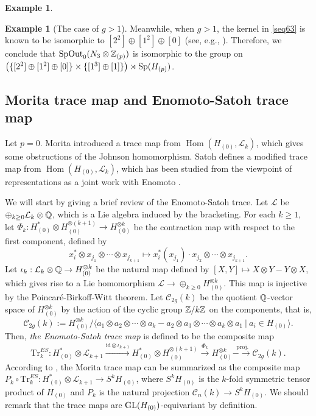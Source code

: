 \documentclass{article}
\theoremstyle{plain}
\theoremstyle{definition}
\newtheorem{exa}[thm]{Example}
\def\Hom{\mathop{\mathrm{Hom}}\nolimits}
\newcommand{\lra}{\longrightarrow}
\newcommand{\ra}{\rightarrow}
\newcommand{\Q}{{\Bbb Q}}
\newcommand{\Z}{{\Bbb Z}}
\newcommand{\Sp}{{\rm Sp}}
\newcommand{\GL}{{\rm GL}}
\newcommand{\SpOut}{{\rm SpOut}}
\newcommand{\id}{{\mathrm{id}}}
\begin{document}
{\begin{exa}
\end{exa}
\begin{exa}
[{The case of $g>1$}]\label{ex14k2} Meanwhile, when $g>1$, the kernel in \eqref{seq63} is known to be isomorphic to $[2^2]\oplus[1^2] \oplus [0] $ (see, e.g., \cite[page 33]{Sa}).
Therefore, we conclude that $\SpOut_0( N_3 \otimes \Z_{(p)}) $ is isomorphic to the group on $\bigl(\{ [2^2 ] \oplus [1^2] \oplus [0]\} \times \{ [1^3] \oplus [1] \} \bigr) \rtimes \Sp(H_{(p)})$.
\end{exa}

\subsection{Morita trace map and Enomoto-Satoh trace map}
\label{93123}
Let $p=0$. Morita \cite{Mo3} introduced a trace map from $ \Hom( H_{(0)}, \mathcal{L}_k )$, which gives some obstructions of the Johnson homomorphism. Satoh \cite{Sa1} defines a modified trace map from $ \Hom( H_{(0)}, \mathcal{L}_k )$, which has been studied from the viewpoint of representations as a joint work with Enomoto \cite{ES}. %

We will start by giving a brief review of the Enomoto-Satoh trace. Let $ \mathcal{L} $ be $\oplus_{k \geq 0 }\mathcal{L}_k \otimes \Q $, which is a Lie algebra induced by the bracketing. For each $k \geq 1$, let $\Phi_k: H^*_{(0)} \otimes H^{\otimes (k+1)}_{(0)} \ra H^{\otimes k}_{(0)}$ be the contraction map with respect to the first component, defined by
\[ x_i^* \otimes x_{j_1} \otimes \cdots \otimes x_{j_{k+1}} \longmapsto
x_i^*(x_{j_1}) \cdot x_{j_2} \otimes \cdots \otimes x_{j_{k+1}} . \]
Let $\iota_k : \mathcal{L}_k \otimes \Q \ra H^{\otimes k}_{(0)} $ be the natural map defined by $[X,Y] \mapsto X\otimes Y -Y \otimes X$, which gives rise to a Lie homomorphism $ \mathcal{L} \ra \oplus_{k \geq 0 }H^{\otimes k}_{(0)} $. This map is injective by the Poincar\'{e}-Birkoff-Witt theorem. Let $\mathcal{C}_{2g}(k)$ be the quotient $\Q$-vector space of $ H^{\otimes k}_{(0)}$ by the action of the cyclic group $\Z/k\Z$ on the components, that is,
\[\mathcal{C}_{2g} (k):= H^{\otimes k}_{(0)}/ \langle
a_1 \otimes a_2 \otimes \cdots \otimes a_k - a_2 \otimes a_3 \otimes \cdots \otimes a_k \otimes a_1 \ | \ a_i \in H_{(0)} \rangle . \]
Then, {\it the Enomoto-Satoh trace map} is defined to be the composite map
\[ \mathrm{Tr}_{k}^{ES} : H^*_{(0)} \otimes \mathcal{L}_{k+1} \xrightarrow{\id \otimes \iota_{k+1} } H^*_{(0)} \otimes H^{\otimes (k+1)}_{(0)} \stackrel{\Phi_k }{\lra} H^{\otimes k}_{(0)}
\stackrel{\mathrm{proj.}}{- \!\!\!\! \lra} \mathcal{C}_{2g}(k).\]
According to \cite[Section 7]{Sa}, the Morita trace map \cite{Mo3} can be summarized as the composite map $P_k \circ \mathrm{Tr}_{k}^{ES} : H^*_{(0)} \otimes \mathcal{L}_{k+1}\ra S^k H_{(0)} $, where $S^k H_{(0)}$ is the $k$-fold symmetric tensor product of $H_{(0)}$ and $P_k$ is the natural projection $\mathcal{C}_n(k) \ra S^k H_{(0)}$. We should remark that the trace maps are $\GL(H_{(0)}) $-equivariant by definition.

}
\end{document}
